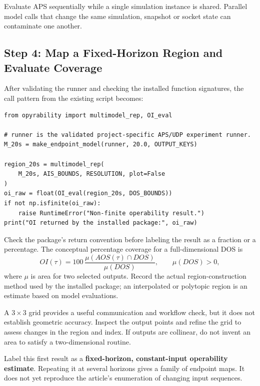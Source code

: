 \documentclass[11pt, letterpaper]{article}
\begin{document}
Evaluate APS sequentially while a single simulation instance is shared. Parallel model calls that change the same simulation, snapshot or socket state can contaminate one another.

\subsection{Step 4: Map a Fixed-Horizon Region and Evaluate Coverage}
After validating the runner and checking the installed function signatures, the call pattern from the existing script becomes:

\begin{lstlisting}[style=pythonstyle,caption={Call pattern inherited from the supplied Opyrability script}]
from opyrability import multimodel_rep, OI_eval

# runner is the validated project-specific APS/UDP experiment runner.
M_20s = make_endpoint_model(runner, 20.0, OUTPUT_KEYS)

region_20s = multimodel_rep(
    M_20s, AIS_BOUNDS, RESOLUTION, plot=False
)
oi_raw = float(OI_eval(region_20s, DOS_BOUNDS))
if not np.isfinite(oi_raw):
    raise RuntimeError("Non-finite operability result.")
print("OI returned by the installed package:", oi_raw)
\end{lstlisting}

Check the package's return convention before labeling the result as a fraction or a percentage. The conceptual percentage coverage for a full-dimensional DOS is
\begin{equation}
OI(\tau)=100\,
\frac{\mu\!\left(AOS(\tau)\cap DOS\right)}{\mu(DOS)},
\qquad \mu(DOS)>0,
\end{equation}
where $\mu$ is area for two selected outputs. Record the actual region-construction method used by the installed package; an interpolated or polytopic region is an estimate based on model evaluations.

A $3\times3$ grid provides a useful communication and workflow check, but it does not establish geometric accuracy. Inspect the output points and refine the grid to assess changes in the region and index. If outputs are collinear, do not invent an area to satisfy a two-dimensional routine.

\begin{notebox}
Label this first result as a \textbf{fixed-horizon, constant-input operability estimate}. Repeating it at several horizons gives a family of endpoint maps. It does not yet reproduce the article's enumeration of changing input sequences.
\end{notebox}
\end{document}
